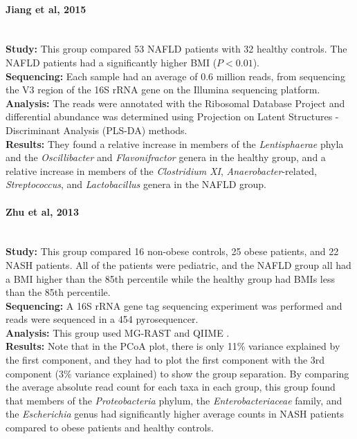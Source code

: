 \paragraph{Jiang et al, 2015 \cite{jiang2015dysbiosis}}\mbox{}\\
\textbf{Study:} This group compared 53 NAFLD patients with 32 healthy controls. The NAFLD patients had a significantly higher BMI ($P<0.01$).\\
\textbf{Sequencing:} Each sample had an average of 0.6 million reads, from sequencing the V3 region of the 16S rRNA gene on the Illumina sequencing platform.\\
\textbf{Analysis:} The reads were annotated with the Ribosomal Database Project \cite{cole2009ribosomal} and differential abundance was determined using Projection on Latent Structures - Discriminant Analysis (PLS-DA) methods.\\
\textbf{Results:} They found a relative increase in members of the \textit{Lentisphaerae} phyla and the \textit{Oscillibacter} and \textit{Flavonifractor} genera in the healthy group, and a relative increase in members of the \textit{Clostridium XI}, \textit{Anaerobacter}-related, \textit{Streptococcus}, and \textit{Lactobacillus} genera in the NAFLD group.

\paragraph{Zhu et al, 2013 \cite{zhu2013characterization}}\mbox{}\\
\textbf{Study:} This group compared 16 non-obese controls, 25 obese patients, and 22 NASH patients. All of the patients were pediatric, and the NAFLD group all had a BMI higher than the 85th percentile while the healthy group had BMIs less than the 85th percentile.\\
\textbf{Sequencing:} A 16S rRNA gene tag sequencing experiment was performed and reads were sequenced in a 454 pyrosequencer.\\
\textbf{Analysis:} This group used MG-RAST \cite{meyer2008metagenomics} and QIIME \cite{caporaso2010qiime}.\\
\textbf{Results:} Note that in the PCoA plot, there is only 11\% variance explained by the first component, and they had to plot the first component with the 3rd component (3\% variance explained) to show the group separation. By comparing the average absolute read count for each taxa in each group, this group found that members of the \textit{Proteobacteria} phylum, the \textit{Enterobacteriaceae} family, and the \textit{Escherichia} genus had significantly higher average counts in NASH patients compared to obese patients and healthy controls.

